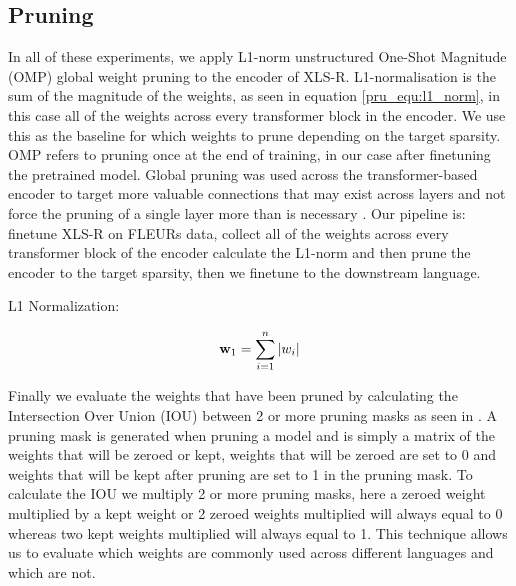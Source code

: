 \subsection{Pruning}
In all of these experiments, we apply L1-norm unstructured One-Shot Magnitude (OMP) global weight pruning to the encoder of XLS-R. L1-normalisation is the sum of the magnitude of the weights, as seen in equation \ref{pru_equ:l1_norm}, in this case all of the weights across every transformer block in the encoder. We use this as the baseline for which weights to prune depending on the target sparsity. OMP refers to pruning once at the end of training, in our case after finetuning the pretrained model. Global pruning was used across the transformer-based encoder to target more valuable connections that may exist across layers and not force the pruning of a single layer more than is necessary \cite{frankle2018LTH}. Our pipeline is: finetune XLS-R on FLEURs data, collect all of the weights across every transformer block of the encoder calculate the L1-norm and then prune the encoder to the target sparsity, then we finetune to the downstream language.

\newpage
L1 Normalization:%

\begin{equation}\label{pru_equ:l1_norm}
\centering
    \mathbf{w}_1 = \sum_{i=1}^{n} |w_i|
\end{equation}

Finally we evaluate the weights that have been pruned by calculating the Intersection Over Union (IOU) between 2 or more pruning masks as seen in \cite{PARP}. A pruning mask is generated when pruning a model and is simply a matrix of the weights that will be zeroed or kept, weights that will be zeroed are set to 0 and weights that will be kept after pruning are set to 1 in the pruning mask. To calculate the IOU we multiply 2 or more pruning masks, here a zeroed weight multiplied by a kept weight or 2 zeroed weights multiplied will always equal to 0 whereas two kept weights multiplied will always equal to 1. This technique allows us to evaluate which weights are commonly used across different languages and which are not.

